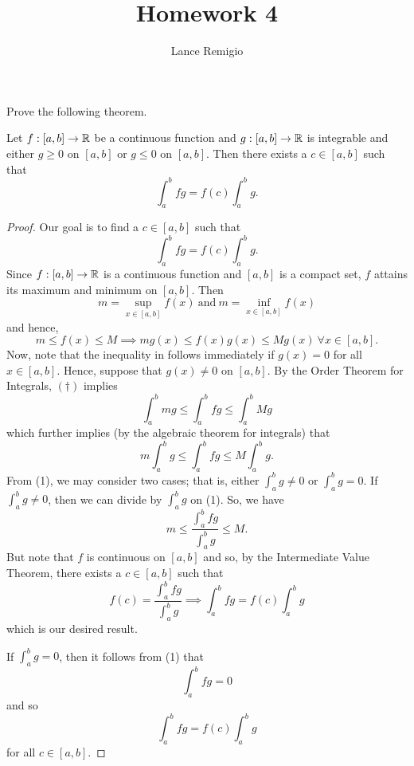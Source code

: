 \documentclass[a4paper]{article}
\title{Homework 4}
\author{Lance Remigio}
\begin{document}
\maketitle


\begin{problem}
   Prove the following theorem. 
\end{problem}
\begin{theorem}
    Let \( f: [a,b] \to \mathbb{R}  \) be a continuous function and \( g:[a,b] \to \mathbb{R}  \) is integrable and either \( g \geq 0  \) on \( [a,b] \) or \( g \leq 0  \) on \( [a,b] \). Then there exists a \( c \in [a,b] \) such that 
    \[  \int_{ a }^{ b } fg = f(c) \int_{ a }^{ b } g. \tag{*}  \]
\end{theorem}
\begin{proof}
    Our goal is to find a \( c \in [a,b] \) such that 
    \[  \int_{ a }^{ b } fg = f(c) \int_{ a }^{ b } g. \]
    Since \( f:[a,b] \to \mathbb{R}  \) is a continuous function and \( [a,b]  \) is a compact set, \( f  \) attains its maximum and minimum on \( [a,b] \). Then 
    \[  m = \sup_{x \in [a,b]} f(x) \ \text{and} \ m = \inf_{x\in[a,b]} f(x) \]
    and hence, 
    \[  m \leq f(x) \leq M  \implies m g(x) \leq f(x) g(x) \leq M g(x) \ \forall x \in [a,b]. \tag{\( \dagger \)} \]
    Now, note that the inequality in follows immediately if \( g(x) = 0  \) for all \( x \in [a,b] \). Hence, suppose that \( g(x) \neq 0  \) on \( [a,b] \). By the Order Theorem for Integrals, \( (\dagger )\) implies
    \[ \int_{ a }^{ b }  m g \leq \int_{ a }^{ b }  fg \leq \int_{ a }^{ b } M g  \]
    which further implies (by the algebraic theorem for integrals) that
    \[  m \int_{ a }^{ b } g  \leq \int_{ a }^{ b } fg  \leq M \int_{ a }^{ b } g. \tag{1} \]
    From (1), we may consider two cases; that is, either \( \int_{ a }^{ b }  g  \neq 0  \) or \( \int_{ a }^{ b }  g  = 0   \).
    If \( \int_{ a }^{ b  }  g   \neq 0  \), then we can divide by \( \int_{ a }^{ b } g  \) on (1). So, we have 
    \[  m \leq \frac{ \int_{ a }^{ b } fg  }{ \int_{ a }^{ b } g   } \leq M.  \]
    But note that \( f  \) is continuous on \( [a,b] \) and so, by the Intermediate Value Theorem, there exists a \( c \in [a,b] \) such that 
    \[  f(c) = \frac{ \int_{ a }^{ b } fg   }{ \int_{ a }^{ b } g  } \implies \int_{ a }^{ b } fg = f(c) \int_{ a }^{ b } g \]
    which is our desired result.
    
    If \( \int_{ a }^{ b }  g   =0  \), then it follows from (1) that 
    \[  \int_{ a }^{ b }  fg  = 0  \]
    and so 
    \[  \int_{ a }^{ b } fg  = f(c) \int_{ a }^{ b }  g   \]
    for all \( c \in [a,b] \).
    \end{proof}
\end{document}
